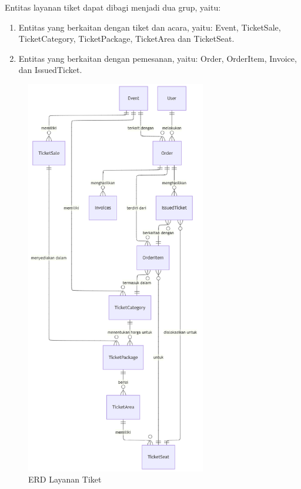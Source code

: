 Entitas layanan tiket dapat dibagi menjadi dua grup, yaitu:

\begin{enumerate}
    \item Entitas yang berkaitan dengan tiket dan acara, yaitu: Event, TicketSale, TicketCategory, TicketPackage, TicketArea dan TicketSeat.
    \item Entitas yang berkaitan dengan pemesanan, yaitu: Order, OrderItem, Invoice, dan IssuedTicket.
\end{enumerate}


\begin{figure}[htbp]
    \centering
    \includegraphics[width=0.7\textwidth]{resources/chapter-3/erd-mini.png}
    \caption{ERD Layanan Tiket}
    \label{fig:erd-ticket-service}
\end{figure}


